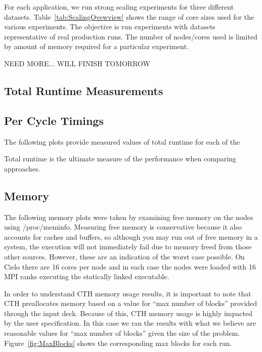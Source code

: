 
For each application, we run strong scaling experiments for three different datasets.  
Table~\ref{tab:ScalingOvewview} shows the range of core sizes used for the various
experiments.  The objective is run experiments with datasets representative of real
production runs.  The number of nodes/cores used is limited by amount of memory required
for a particular experiment.  


NEED MORE... WILL FINISH TOMORROW


\subsection{Total Runtime Measurements}


\subsection{Per Cycle Timings}





The following plots provide measured values of total runtime for each of the 

Total runtime is the ultimate measure of the performance when comparing 
approaches.  


\subsection{Memory}
The following memory plots were taken by examining free memory on the nodes
using /proc/meminfo.  Measuring free memory is conservative because it also
accounts for caches and buffers, so although you may run out of free memory in
a system, the execution will not immediately fail due to memory freed from
those other sources.  However, these are an indication of the worst case
possible.  On Cielo there are 16 cores per node and in each case the nodes were
 loaded with 16 MPI ranks executing the statically linked executable.  

In order to understand CTH memory usage results, it is important to note that
CTH preallocates memory based on a value for ``max number of blocks'' provided
through the input deck.  Because of this, CTH memory usage is highly impacted
by the user specification.  In this case we ran the results with what we
believe are reasonable values for ``max number of blocks'' given the size of the
problem.  Figure~\ref{fig:MaxBlocks} shows the corresponding max blocks for
each run.

